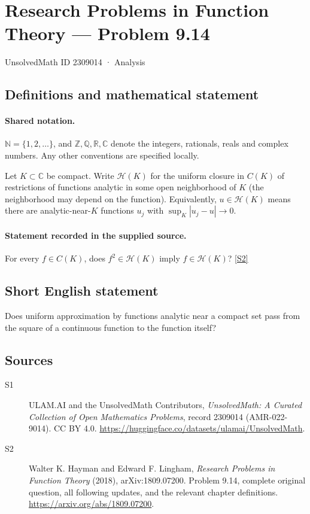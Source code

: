 \documentclass[11pt]{book}
\newcommand{\sref}[2]{\hyperlink{source:#1:#2}{[S#2]}}
\begin{document}
\setcounter{section}{2309013}
\section{Research Problems in Function Theory — Problem 9.14}\label{2309014}
{\small\sffamily UnsolvedMath ID 2309014 · Analysis}
\subsection{Definitions and mathematical statement}

\paragraph{Shared notation.}$\mathbb N=\{1,2,\ldots\}$, and $\mathbb Z,\mathbb Q,\mathbb R,\mathbb C$ denote the integers, rationals, reals and complex numbers. Any other conventions are specified locally.


Let $K\subset\mathbb C$ be compact. Write $\mathcal H(K)$ for the uniform closure in $C(K)$ of restrictions of functions analytic in some open neighborhood of $K$ (the neighborhood may depend on the function). Equivalently, $u\in\mathcal H(K)$ means there are analytic-near-$K$ functions $u_j$ with $\sup_K|u_j-u|\to0$.
\paragraph{Statement recorded in the supplied source.}
For every $f\in C(K)$, does $f^2\in\mathcal H(K)$ imply $f\in\mathcal H(K)$? \sref{2309014}{2}
\subsection{Short English statement}
Does uniform approximation by functions analytic near a compact set pass from the square of a continuous function to the function itself?
\subsection{Sources}
\begin{description}
\item[\hypertarget{source:2309014:1}{S1}] ULAM.AI and the UnsolvedMath Contributors, \emph{UnsolvedMath: A Curated Collection of Open Mathematics Problems}, record 2309014 (AMR-022-9014). CC BY 4.0. \url{https://huggingface.co/datasets/ulamai/UnsolvedMath}.
\item[\hypertarget{source:2309014:2}{S2}] Walter K. Hayman and Edward F. Lingham, \emph{Research Problems in Function Theory} (2018), arXiv:1809.07200. Problem 9.14, complete original question, all following updates, and the relevant chapter definitions. \url{https://arxiv.org/abs/1809.07200}.
\end{description}
\label{end:2309014}
\end{document}
